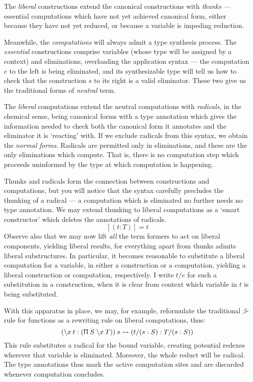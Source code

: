 \documentclass{jfp1}
\begin{document}
The \emph{liberal} constructions extend the canonical constructions
with \emph{thunks} --- essential computations which have not yet achieved canonical
form, either because they have not yet reduced, or because a variable
is impeding reduction.

Meanwhile, the \emph{computations} will always admit a type synthesis
process. The \emph{essential} constructions comprise variables (whose
type will be assigned by a context) and eliminations, overloading the
application syntax --- the computation $e$ to the left is being
eliminated, and its synthesizable
type will tell us how to check that the construction $s$ to its right
is a valid eliminator. These two give us the traditional forms
of \emph{neutral} term.

The \emph{liberal} computations extend the neutral computations with
\emph{radicals}, in the chemical sense, being canonical forms with a
type annotation which gives the information needed to check both the
canonical form it annotates and the eliminator it is `reacting' with.
If we exclude radicals from this syntax, we obtain the \emph{normal
  forms}. Radicals are permitted only in eliminations, and these are
the only eliminations which compute. That is, there is no computation
step which proceeds uninformed by the type at which computation is
happening.

Thunks and radicals form the connection between constructions and
computations, but you will notice that the syntax carefully precludes
the thunking of a radical --- a computation which is eliminated no
further needs no type annotation. We may extend thunking to liberal
computations as a `smart constructor' which deletes the annotations
of radicals.
\[
  [(t:T)] = t
\]
Observe also that we may now lift
\emph{all} the term formers to act on liberal components, yielding
liberal results, for everything apart from thunks admits
liberal substructures. In particular, it becomes reasonable to
substitute a liberal computation for a variable, in either a
construction or a computation, yielding a liberal construction or
computation, respectively. I write $t/e$ for such a substitution
in a construction, when it is clear from context which variable in
$t$ is being substituted.

With this apparatus in place, we may, for example, reformulate the traditional
$\beta$-rule for functions as a rewriting rule on liberal
computations, thus:
\[
  (\backslash x\:t : (\Uppi\:S\;\backslash x\:{T}))\:s \rightsquigarrow (t/(s:S):T/(s:S))
\]
This rule substitutes a radical
for the bound variable, creating potential redexes wherever that
variable is eliminated. Moreover, the whole reduct will be radical. The type
annotations thus mark the active computation sites and are discarded
whenever computation concludes.
\end{document}
